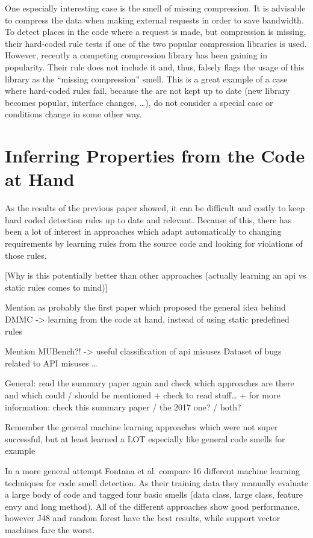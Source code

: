One especially interesting case is the smell of missing compression.
It is advisable to compress the data when making external requests in order to save bandwidth.
To detect places in the code where a request is made, but compression is missing, their hard-coded rule tests if one of the two popular compression libraries is used.
However, recently a competing compression library has been gaining in popularity.
Their rule does not include it and, thus, falsely flags the usage of this library as the ``missing compression'' smell.
This is a great example of a case where hard-coded rules fail, because the are not kept up to date (new library becomes popular, interface changes, \ldots), do not consider a special case or conditions change in some other way.

\section{Inferring Properties from the Code at Hand}

As the results of the previous paper showed, it can be difficult and costly to keep hard coded detection rules up to date and relevant.
Because of this, there has been a lot of interest in approaches which adapt automatically to changing requirements by learning rules from the source code and looking for violations of those rules.

[Why is this potentially better than other approaches (actually learning an api vs static rules comes to mind)]

Mention \cite{engler2001bugs} as probably the first paper which proposed the general idea behind DMMC -> learning from the code at hand, instead of using static predefined rules

Mention MUBench?!
    -> useful classification of api misuses
    Dataset of bugs related to API misuses
    \ldots

General: read the summary paper \cite{robillard2013automated} again and check which approaches are there and which could / should be mentioned
+ check to read stuff\ldots
+ for more information: check this summary paper / the 2017 one? / both?

Remember the general machine learning approaches which were not super successful, but at least learned a LOT
especially like general code smells for example

In a more general attempt Fontana et al. \cite{fontana2016comparing} compare 16 different machine learning techniques for code smell detection.
As their training data they manually evaluate a large body of code and tagged four basic smells (data class, large class, feature envy and long method).
All of the different approaches show good performance, however J48 and random forest have the best results, while support vector machines fare the worst.

